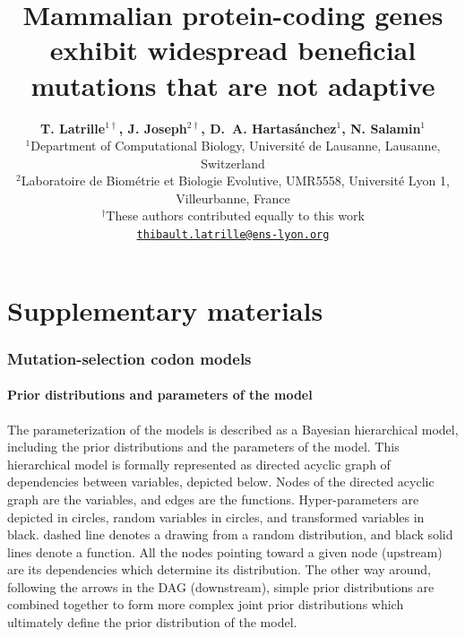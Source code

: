 \documentclass{article}
\title{\textbf{Mammalian protein-coding genes exhibit widespread beneficial mutations that are not adaptive}}
\author{
    \large
    \textbf{T. {Latrille}$^{1\dag}$\orcidlink{0000-0002-9643-4668}, J. {Joseph}$^{2\dag}$\orcidlink{0009-0002-1312-9930}, D.~A. {Hartasánchez}$^{1}$\orcidlink{0000-0003-2596-6883}, N. {Salamin}$^{1}$\orcidlink{0000-0002-3963-4954}}\\
    \scriptsize $^{1}$Department of Computational Biology, Université de Lausanne, Lausanne, Switzerland\\
    \scriptsize $^{2}$Laboratoire de Biométrie et Biologie Evolutive, UMR5558, Université Lyon 1, Villeurbanne, France \\
    \scriptsize $^{\dag}$These authors contributed equally to this work\\
    \normalsize \texttt{\href{mailto:thibault.latrille@ens-lyon.org}{thibault.latrille@ens-lyon.org}} \\
}
\date{}
\begin{document}
    \maketitle
    \part*{Supplementary materials}
    \tableofcontents

    \newpage
    \listoffigures

    \newpage
    \listoftables

    \clearpage
    \section{Mutation-selection codon models}\label{sec:mutsel}

    \subsection{Prior distributions and parameters of the model}\label{subsec:priors}

    The parameterization of the models is described as a Bayesian hierarchical model, including the prior distributions and the parameters of the model.
    This hierarchical model is formally represented as directed acyclic graph of dependencies between variables, depicted below.
    Nodes of the directed acyclic graph are the variables, and edges are the functions.
    Hyper-parameters are depicted in {\color{RED}{red}} circles, random variables in {\color{BLUE}{blue}} circles, and transformed variables in black.
            {\color{BLUE}{Blue}} dashed line denotes a drawing from a random distribution, and black solid lines denote a function.
    All the nodes pointing toward a given node (upstream) are its dependencies which determine its distribution.
    The other way around, following the arrows in the DAG (downstream), simple {prior} distributions are combined together to form more complex joint {prior} distributions which ultimately define the {prior} distribution of the model.
\end{document}
